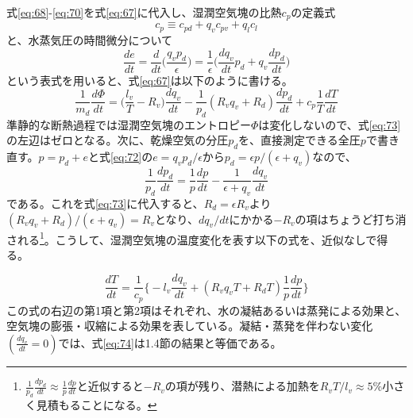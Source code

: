 \documentclass{ltjsarticle}
\begin{document}
式\eqref{eq:68}-\eqref{eq:70}を式\eqref{eq:67}に代入し、湿潤空気塊の比熱$c_{p}$の定義式
\begin{equation}\label{eq:71}
c_{p} \equiv c_{pd}+q_{v}c_{pv}+q_{l}c_{l}
\end{equation}
と、水蒸気圧の時間微分について
\begin{equation}\label{eq:72}
\frac{de}{dt}=\frac{d}{dt}{\bigg (}\frac{q_{v}p_{d}}{\epsilon}{\bigg )}=\frac{1}{\epsilon}{\bigg (}\frac{dq_{v}}{dt}p_{d}+q_{v}\frac{dp_{d}}{dt}{\bigg )}
\end{equation}
という表式を用いると、式\eqref{eq:67}は以下のように書ける。
\begin{equation}\label{eq:73}
\frac{1}{m_{d}}\frac{d\Phi}{dt} = {\bigg (}\frac{l_{v}}{T}-R_{v}{\bigg )}\frac{dq_{v}}{dt}-\frac{1}{p_{d}}(R_{v}q_{v}+R_{d})\frac{dp_{d}}{dt}+c_{p}\frac{1}{T}\frac{dT}{dt}
\end{equation}
準静的な断熱過程では湿潤空気塊のエントロピー$\Phi$は変化しないので、式\eqref{eq:73}の左辺はゼロとなる。次に、乾燥空気の分圧$p_{d}$を、直接測定できる全圧$p$で書き直す。$p=p_{d}+e$と式\eqref{eq:72}の$e=q_{v}p_{d}/\epsilon$から$p_{d}=\epsilon p/(\epsilon+q_{v})$なので、
\begin{equation}\label{eq:73b}
\frac{1}{p_{d}}\frac{dp_{d}}{dt}=\frac{1}{p}\frac{dp}{dt}-\frac{1}{\epsilon+q_{v}}\frac{dq_{v}}{dt}
\end{equation}
である。これを式\eqref{eq:73}に代入すると、$R_{d}=\epsilon R_{v}$より$(R_{v}q_{v}+R_{d})/(\epsilon+q_{v})=R_{v}$となり、$dq_{v}/dt$にかかる$-R_{v}$の項はちょうど打ち消される\footnote{$\frac{1}{p_{d}}\frac{dp_{d}}{dt}\approx\frac{1}{p}\frac{dp}{dt}$と近似すると$-R_{v}$の項が残り、潜熱による加熱を$R_{v}T/l_{v}\approx 5\%$小さく見積もることになる。}。こうして、湿潤空気塊の温度変化を表す以下の式を、近似なしで得る。

\begin{equation}\label{eq:74}
\frac{dT}{dt} = \frac{1}{c_{p}}{\bigg \{}-l_{v}\frac{dq_{v}}{dt}+(R_{v}q_{v}T+R_{d}T)\frac{1}{p}\frac{dp}{dt}{\bigg \}}
\end{equation}
この式の右辺の第1項と第2項はそれぞれ、水の凝結あるいは蒸発による効果と、空気塊の膨張・収縮による効果を表している。凝結・蒸発を伴わない変化$(\frac{dq_{v}}{dt}=0)$では、式\eqref{eq:74}は1.4節の結果と等価である。
\end{document}
